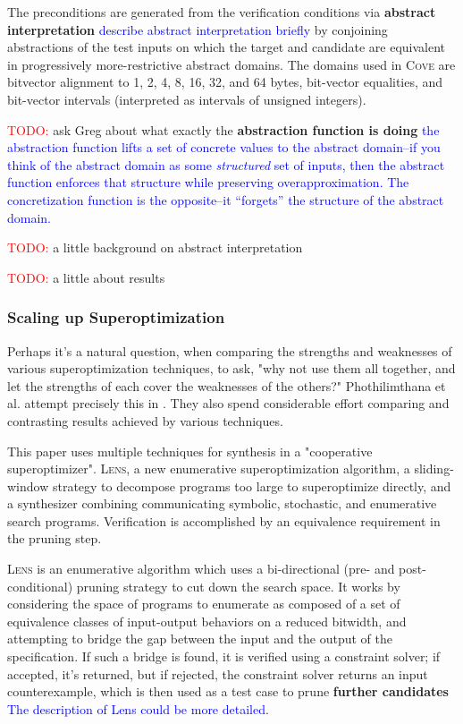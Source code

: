 \documentclass[12pt,twoside]{reedthesis}
\newcommand{\red}[1]{\textcolor{red}{#1}}
\newcommand{\comment}[2]{\textbf{#1} \textcolor{blue}{#2}}
\begin{document}
The preconditions are generated from the verification conditions via
    \comment{abstract interpretation}{describe abstract interpretation briefly}
    by conjoining abstractions of the test inputs on which the target and candidate are equivalent in progressively more-restrictive abstract domains.
The domains used in \textsc{Cove} are bitvector alignment to 1, 2, 4, 8, 16, 32, and 64 bytes, bit-vector equalities, and bit-vector intervals (interpreted as intervals of unsigned integers).
    
\red{TODO:} ask Greg about what exactly the \comment{abstraction function is doing}{the abstraction function lifts a set of concrete values to the abstract domain--if you think of the abstract domain as some \emph{structured} set of inputs, then the abstract function enforces that structure while preserving overapproximation. The concretization function is the opposite--it ``forgets'' the structure of the abstract domain.}
    
\red{TODO:} a little background on abstract interpretation
    
\red{TODO:} a little about results

\subsubsection{Scaling up Superoptimization}

Perhaps it's a natural question, when comparing the strengths and weaknesses of various superoptimization techniques, to ask, "why not use them all together, and let the strengths of each cover the weaknesses of the others?"
Phothilimthana et al. attempt precisely this in \cite{phothilimthana2016scaling}.
They also spend considerable effort comparing and contrasting results achieved by various techniques.
    
This paper uses multiple techniques for synthesis in a "cooperative superoptimizer".
\textsc{Lens}, a new enumerative superoptimization algorithm,
a sliding-window strategy to decompose programs too large to superoptimize directly,
and a synthesizer combining communicating symbolic, stochastic, and enumerative search programs.
Verification is accomplished by an equivalence requirement in the pruning step.
    
\textsc{Lens} is an enumerative algorithm which uses a bi-directional (pre- and post-conditional) pruning strategy to cut down the search space.
It works by considering the space of programs to enumerate as composed of a set of equivalence classes of input-output behaviors on a reduced bitwidth, and attempting to bridge the gap between the input and the output of the specification.
If such a bridge is found, it is verified using a constraint solver;
        if accepted, it's returned,
        but if rejected, the constraint solver returns an input counterexample,
    which is then used as a test case to prune
    \comment{further candidates}{The description of Lens could be more detailed}.
\end{document}
